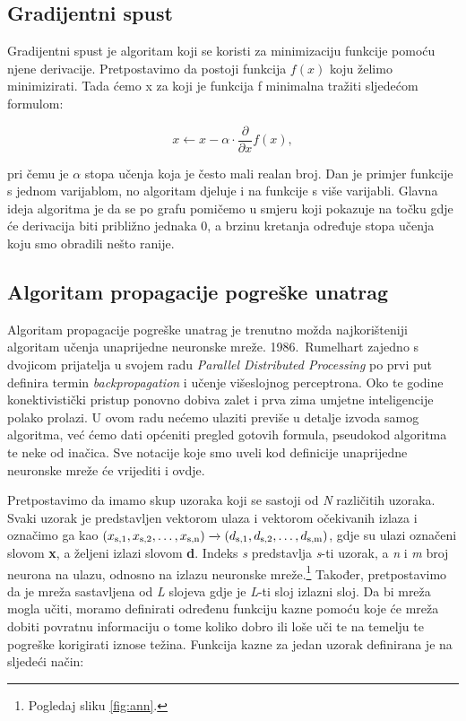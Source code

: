 \documentclass[times, utf8, zavrsni]{fer}
\begin{document}
\subsection{Gradijentni spust}
Gradijentni spust  je algoritam koji se koristi za minimizaciju funkcije pomoću njene derivacije. Pretpostavimo da postoji funkcija $f(x)$ koju želimo minimizirati. Tada ćemo x za koji je funkcija f minimalna tražiti sljedećom formulom:

\begin{equation}
    \label{eq:grad}
    x \leftarrow x - \alpha \cdot{\frac{\partial}{\partial x}}f(x),
\end{equation}

pri čemu je $\alpha$ stopa učenja koja je često mali realan broj. Dan je primjer funkcije s jednom varijablom, no algoritam djeluje i na funkcije s više varijabli. Glavna ideja algoritma je da se po grafu pomičemo u smjeru koji pokazuje na točku gdje će derivacija biti približno jednaka 0, a brzinu kretanja određuje stopa učenja koju smo obradili nešto ranije.

\subsection{Algoritam propagacije pogreške unatrag}
Algoritam propagacije pogreške unatrag  je trenutno možda najkorišteniji algoritam učenja unaprijedne neuronske mreže. 1986.\ Rumelhart zajedno s dvojicom prijatelja u svojem radu \textit{Parallel Distributed Processing} po prvi put definira termin \textit{backpropagation} i učenje višeslojnog perceptrona. Oko te godine konektivistički pristup ponovno dobiva zalet i prva zima umjetne inteligencije polako prolazi. U ovom radu nećemo ulaziti previše u detalje izvoda samog algoritma, već ćemo dati općeniti pregled gotovih formula, pseudokod algoritma te neke od inačica. Sve notacije koje smo uveli kod definicije unaprijedne neuronske mreže će vrijediti i ovdje.

Pretpostavimo da imamo skup uzoraka koji se sastoji od \textit{N} različitih uzoraka. Svaki uzorak je predstavljen vektorom ulaza i vektorom očekivanih izlaza i označimo ga kao $(x\textsubscript{s,1}, x\textsubscript{s,2},\dots, x\textsubscript{s,n}) \xrightarrow{} (d\textsubscript{s,1}, d\textsubscript{s,2},\dots, d\textsubscript{s,m})$, gdje su ulazi označeni slovom \textbf{x}, a željeni izlazi slovom \textbf{d}. Indeks \textit{s} predstavlja \textit{s}-ti uzorak, a \textit{n} i \textit{m} broj neurona na ulazu, odnosno na izlazu neuronske mreže.\footnote{Pogledaj sliku \ref{fig:ann}.} Također, pretpostavimo da je mreža sastavljena od \textit{L} slojeva gdje je \textit{L}-ti sloj izlazni sloj. Da bi mreža mogla učiti, moramo definirati određenu funkciju kazne pomoću koje će mreža dobiti povratnu informaciju o tome koliko dobro ili loše uči te na temelju te pogreške korigirati iznose težina. Funkcija kazne za jedan uzorak definirana je na sljedeći način:
\end{document}
